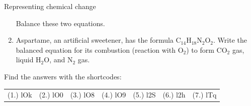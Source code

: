 \begin{eocexercises}{Representing chemical change}
\begin{enumerate}[noitemsep, label=\textbf{\arabic*}. ]
\begin{equation*}
      \end{equation*}
Balance these two equations.
\label{m38727*uid46}\item Aspartame, an artificial sweetener, has the formula ${\text{C}}_{14}{\text{H}}_{18}{\text{N}}_{2}{\text{O}}_{2}$. Write the balanced equation for its combustion (reaction with ${\text{O}}_{2}$) to form ${\text{CO}}_{2}$ gas, liquid $\text{H}_{2}\text{O}$, and ${\text{N}}_{2}$ gas.
\end{enumerate}
  \label{m38727**end}
  \label{337cc49099d6e82169c54b5d0fc3878f**end}
\par {} Find the answers with the shortcodes:
 \par \begin{tabular}[h]{cccccc}
 (1.) lOk  &  (2.) lO0  &  (3.) lO8  &  (4.) lO9  &  (5.) l2S  &  (6.) l2h  &  (7.) lTq  & \end{tabular}
\end{eocexercises}
